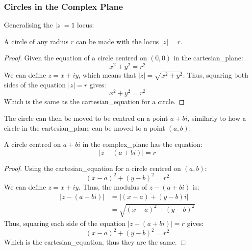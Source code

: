         \subsubsection{Circles in the Complex Plane}
            Generalising the $|z|=1$ locus:
            \begin{theorem}
                A circle of any radius $r$ can be made with the \gls{locus} $|z|=r$.
            \end{theorem}
            \begin{proof}
                Given the equation of a circle centred on $(0,0)$ in the \gls{cartesian_plane}:
                \begin{equation}
                    x^2+y^2=r^2
                \end{equation}
                We can define $z=x+iy$, which means that $|z|=\sqrt{x^2+y^2}$.
                Thus, squaring both sides of the equation $|z|=r$ gives:
                \begin{equation}
                    x^2+y^2=r^2
                \end{equation}
                Which is the same as the \gls{cartesian_equation} for a circle.
            \end{proof}

            The circle can then be moved to be centred on a point $a+bi$, similarly to how a circle in the \gls{cartesian_plane} can be moved to a point $(a,b)$:
            \begin{theorem}
                A circle centred on $a+bi$ in the \gls{complex_plane} has the equation:
                \begin{equation}
                    \left|z-(a+bi)\right|=r
                \end{equation}
            \end{theorem}
            \begin{proof}
                Using the \gls{cartesian_equation} for a circle centred on $(a,b)$:
                \begin{equation}
                    (x-a)^2+(y-b)^2=r^2
                \end{equation}
                We can define $z=x+iy$.
                Thus, the \gls{modulus} of $z-(a+bi)$ is:
                \begin{equation*}
                    \begin{aligned}
                        |z-(a+bi)|&=|(x-a)+(y-b)i| \\
                        &=\sqrt{(x-a)^2+(y-b)^2}
                    \end{aligned}
                \end{equation*}
                Thus, squaring each side of the equation $\left|z-(a+bi)\right|=r$ gives:
                \begin{equation}
                    (x-a)^2+(y-b)^2=r^2
                \end{equation}
                Which is the \gls{cartesian_equation}, thus they are the same.
            \end{proof}

